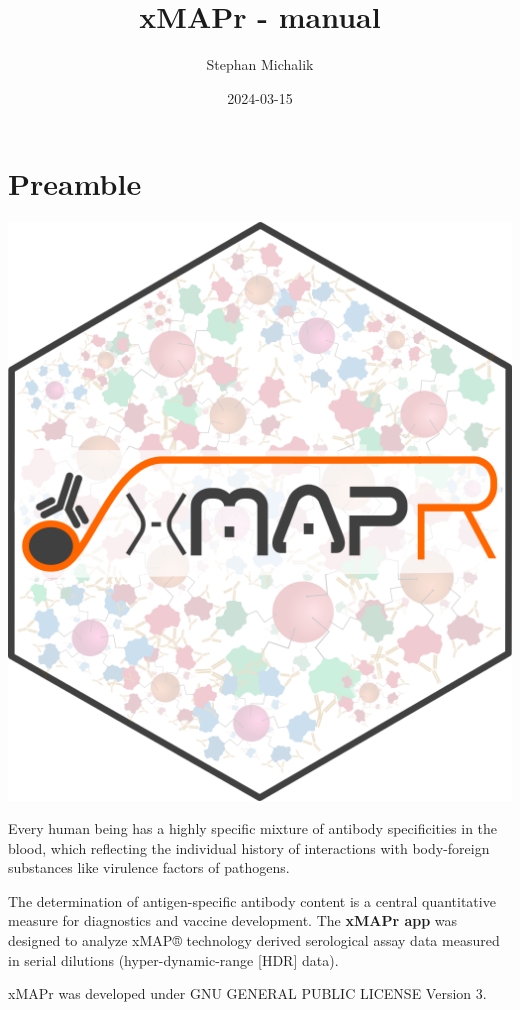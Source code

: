 \documentclass[
]{book}
\title{xMAPr - manual}
\author{Stephan Michalik}
\date{2024-03-15}
\begin{document}
\maketitle

{
\setcounter{tocdepth}{1}
\tableofcontents
}
\hypertarget{preamble}{%
\chapter{Preamble}\label{preamble}}

\includegraphics[width=7.07in]{figures/xMAPr_logo_mod_hexbin}

Every human being has a highly specific mixture of antibody specificities in the blood, which reflecting the individual history of interactions with body-foreign substances like virulence factors of pathogens.

The determination of antigen-specific antibody content is a central quantitative measure for diagnostics and vaccine development. The \textbf{xMAPr app} was designed to analyze xMAP® technology derived serological assay data measured in serial dilutions (hyper-dynamic-range {[}HDR{]} data).

xMAPr was developed under GNU GENERAL PUBLIC LICENSE Version 3.
\end{document}
